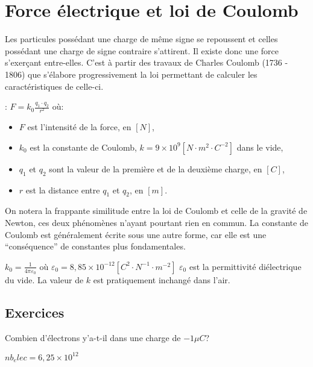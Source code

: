 \chapter{Force électrique et loi de Coulomb}
Les particules possédant une charge de même signe se repoussent et celles possédant une charge de signe contraire s'attirent. Il existe donc une force s'exerçant entre-elles.
C'est à partir des travaux de Charles Coulomb (1736 - 1806) que s'élabore progressivement la loi permettant de calculer les caractéristiques de celle-ci.
\begin{encadre}
     : \(F=k_0 \frac{q_1 \cdot q_2}{r^2}\)
    où:
    \begin{itemize}[label=\textbullet]
        \item \(F\) est l'intensité de la force, en \([N]\),
        \item \(k_0\) est la constante de Coulomb, \(k=9 \times 10^{9} [N \cdot m^2 \cdot C^{-2}]\) dans le vide,
        \item \(q_1\) et \(q_2\) sont la valeur de la première et de la deuxième charge, en \([C]\),
        \item \(r\) est la distance entre \(q_1\) et \(q_2\), en \([m]\).
    \end{itemize}
\end{encadre}
On notera la frappante similitude entre la loi de Coulomb et celle de la gravité de Newton, ces deux phénomènes n'ayant pourtant rien en commun.
La constante de Coulomb est généralement écrite sous une autre forme, car elle est une \enquote{conséquence} de constantes plus fondamentales.
\begin{encadre}
    \(k_0=\frac{1}{4 \pi \varepsilon_0}\) où \(\varepsilon_0=8,85 \times 10^{-12} [C^2 \cdot N^{-1} \cdot m^{-2}]\)
    \(\varepsilon_0\) est la permittivité diélectrique du vide. La valeur de \(k\) est pratiquement inchangé dans l'air.
\end{encadre}

\newpage

\section{Exercices}
\begin{exercise}
    Combien d'électrons y'a-t-il dans une charge de \(-1 \mu C\)?
\end{exercise}
\begin{solution}
    \(nb_elec=6,25 \times 10^12\)
\end{solution}

